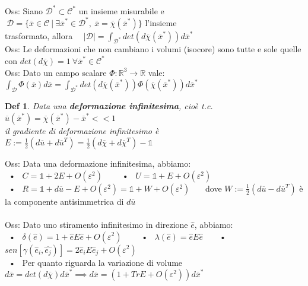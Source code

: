 \documentclass{article}
\theoremstyle{unnumbered}
\newtheorem* {theoremT}{Def}
\theoremstyle{unnumbered1}
\newenvironment{defi}{\begin{gBox}\begin{theoremT}}{\end{theoremT}\end{gBox}}
\begin{document}
%
Oss: Siano $\mathcal{D}^*\subset\mathcal{C}^* $ un insieme misurabile e $ \ \mathcal{D}=\{ \overline{x}\in\mathcal{C} \ | \ \exists \overline{x}^* \in \mathcal{D}^*, \ \overline{x}=\overline{\chi}(\overline{x}^*) \} $ l'insieme \\
\phantom{Oss: }trasformato, allora \ \ $ |\mathcal{D}|=\int_{\mathcal{D}^*}det(d\overline{\chi}(\overline{x}^*))d\overline{x}^*$ \\
%
Oss: Le deformazioni che non cambiano i volumi (isocore) sono tutte e sole quelle con $det(d\overline{\chi})=1 \ \forall \overline{x}^*\in\mathcal{C}^* $\\
%
Oss: Dato un campo scalare $\Phi:\mathbb{R}^3\rightarrow\mathbb{R}$ vale: \ $\int_{\mathcal{D}}\Phi(\overline{x})d\overline{x} = \int_{\mathcal{D}^*} det(d\overline{\chi}(\overline{x}^*))  \Phi(\overline{\chi}(\overline{x}^*))d\overline{x}^*$ \\
%
%
%
\begin{defi}
Data una \textbf{deformazione infinitesima}, cioè t.c. $\overline{u}(\overline{x}^*)=\overline{\chi}(\overline{x}^*) - \overline{x}^* <<1$ \\ il gradiente di deformazione infinitesimo è \ $E:=\frac12 (d\overline{u}+d\overline{u}^T)=\frac12 (d\overline{\chi} + d\overline{\chi}^T)-\mathds{1}$
\end{defi}
%
%
Oss: Data una deformazione infinitesima, abbiamo:\\
\ • \ $C=\mathds{1}+2E+O(\varepsilon^2)$ \ \ \ \ • \ $U=\mathds{1}+E+O(\varepsilon^2)$\\
\ • \ $R=\mathds{1}+d\overline{u}-E+O(\varepsilon^2)=\mathds{1}+W+O(\varepsilon^2)$ \ \ \ dove $W:=\frac12 (d\overline{u}-d\overline{u}^T)$ è la componente antisimmetrica di $d\overline{u}$\\ \\
%
Oss: Dato uno stiramento infinitesimo in direzione $\hat{e}$, abbiamo:\\
\ • \ $\delta(\hat{e})= 1 + \hat{e}E\hat{e} +O(\varepsilon^2)$ \ \ \ \ • \ $\lambda(\hat{e})=\hat{e}E\hat{e}$\ \ \ \ • \ $sen[\gamma(\hat{e}_i,\hat{e_j})]=2\hat{e}_iE\hat{e}_j + O(\varepsilon^2)$\\
\ • \ Per quanto riguarda la variazione di volume \ $d\overline{x}=det(d\overline{\chi})d\overline{x}^* \implies d\overline{x}=(1+TrE+O(\varepsilon^2))d\overline{x}^*$
\end{document}
